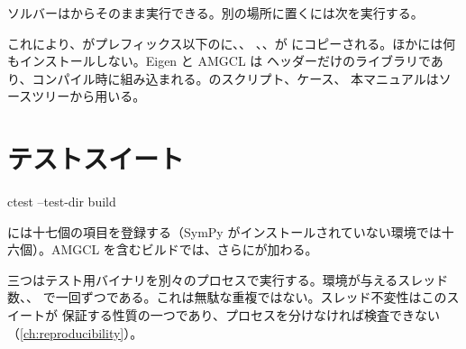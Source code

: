 ソルバーはからそのまま実行できる。別の場所に置くには次を実行する。


これにより、がプレフィックス以下のに、、
、、が
にコピーされる。ほかには何もインストールしない。Eigen と AMGCL は
ヘッダーだけのライブラリであり、コンパイル時に組み込まれる。のスクリプト、ケース、
本マニュアルはソースツリーから用いる。

\section{テストスイート}
\label{sec:install:tests}

\begin{shell}
ctest --test-dir build
\end{shell}

には十七個の項目を登録する（SymPy がインストールされていない環境では十六個）。AMGCL を含むビルドでは、さらにが加わる。

三つはテスト用バイナリを別々のプロセスで実行する。環境が与えるスレッド数、、
で一回ずつである。これは無駄な重複ではない。スレッド不変性はこのスイートが
保証する性質の一つであり、プロセスを分けなければ検査できない（\cref{ch:reproducibility}）。

